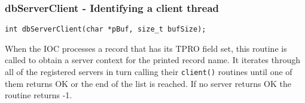 \subsubsection{dbServerClient - Identifying a client thread}

\begin{verbatim}
int dbServerClient(char *pBuf, size_t bufSize);
\end{verbatim}

When the IOC processes a record that has its TPRO field set, this routine is called to obtain a server context for the printed record name.
It iterates through all of the registered servers in turn calling their \verb|client()| routines until one of them returns OK or the end of the list is reached.
If no server returns OK the routine returns -1.



